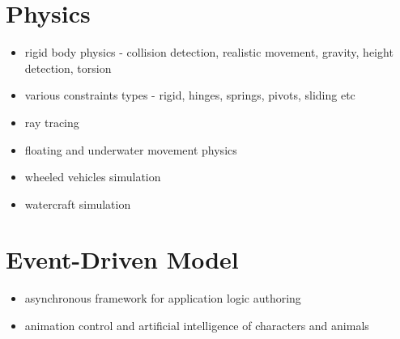 \documentclass[a4paper,12pt,oneside]{sphinxmanual}
\begin{document}
\section{Physics}
\label{features:id12}\begin{itemize}
\item {} 
rigid body physics - collision detection, realistic movement, gravity, height detection, torsion

\item {} 
various constraints types - rigid, hinges, springs, pivots, sliding etc

\item {} 
ray tracing

\item {} 
floating and underwater movement physics

\item {} 
wheeled vehicles simulation

\item {} 
watercraft simulation

\end{itemize}


\section{Event-Driven Model}
\label{features:id13}\begin{itemize}
\item {} 
asynchronous framework for application logic authoring

\item {} 
animation control and artificial intelligence of characters and animals

\end{itemize}
\end{document}
